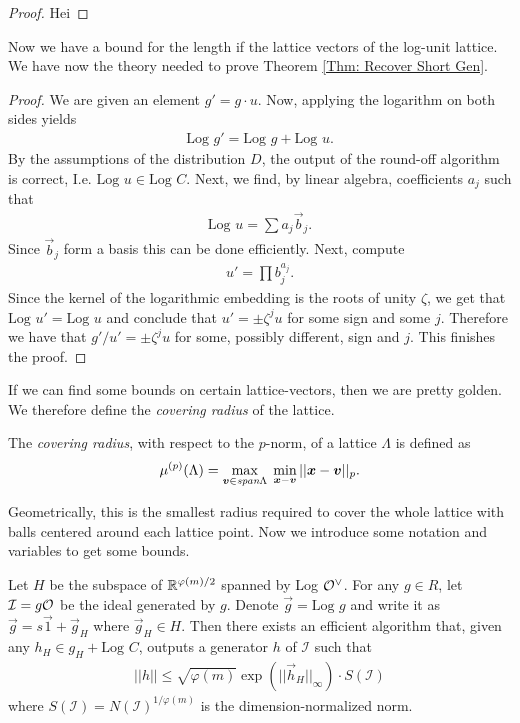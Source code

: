 \begin{proof}
Hei
\end{proof}
Now we have a bound for the length if the lattice vectors of the log-unit lattice. We have now the theory needed to prove Theorem \ref{Thm: Recover Short Gen}.
\begin{proof}
We are given an element \(g' = g\cdot u\). Now, applying the logarithm on both sides yields
\begin{align*}
    \text{Log }g' = \text{Log }g + \text{Log }u.
\end{align*}
By the assumptions of the distribution \(D\), the output of the round-off algorithm is correct, I.e. \(\text{Log }u\in\text{Log }C\). Next, we find, by linear algebra, coefficients \(a_j\) such that 
\begin{align*}
    \text{Log }u = \sum a_j\vec{b}_j.
\end{align*}
Since \(\vec{b}_j\) form a basis this can be done efficiently. Next, compute
\begin{align*}
    u' = \prod b_j^{a_j}.
\end{align*}
Since the kernel of the logarithmic embedding is the roots of unity \(\zeta\), we get that \(\text{Log }u' = \text{Log }u\) and conclude that \(u' = \pm\zeta^j u\) for some sign and some \(j\). Therefore we have that \(g'/u' = \pm\zeta^j u\) for some, possibly different, sign and \(j\). This finishes the proof.
\end{proof}
If we can find some bounds on certain lattice-vectors, then we are pretty golden. We therefore define the \emph{covering radius} of the lattice.
\begin{definition}
    The \emph{covering radius}, with respect to the \(p\)-norm, of a lattice \(\Lambda\) is defined as
    \begin{align*}
        \mu^{(p)}(\Lambda) = \max_{\vec{v}\in\emph{span}\Lambda}\;\min_{\vec{x} - \vec{v}}||\vec{x} - \vec{v}||_p.
    \end{align*}
\end{definition}
Geometrically, this is the smallest radius required to cover the whole lattice with balls centered around each lattice point. Now we introduce some notation and variables to get some bounds. 
\begin{proposition}
    Let \(H\) be the subspace of \(\RR^{\varphi(m)/2}\) spanned by Log \(\OO^\vee\). For any \(g\in R\), let \(\mathcal{I} = g\OO\) be the ideal generated by \(g\). Denote \(\vec{g} = \text{Log }g\) and write it as \(\vec{g} = s\vec{1} + \vec{g}_H\) where \(\vec{g}_H\in H\). Then there exists an efficient algorithm that, given any \(h_H\in g_H + \text{Log }C\), outputs a generator \(h\) of \(\mathcal{I}\) such that 
    \begin{align*}
        ||h|| \leq \sqrt{\varphi (m)}\exp(||\vec{h}_H||_\infty ) \cdot S(\mathcal{I})
    \end{align*}
    where \(S(\mathcal{I}) = N(\mathcal{I})^{1/\varphi(m)}\) is the dimension-normalized norm.
\end{proposition}

